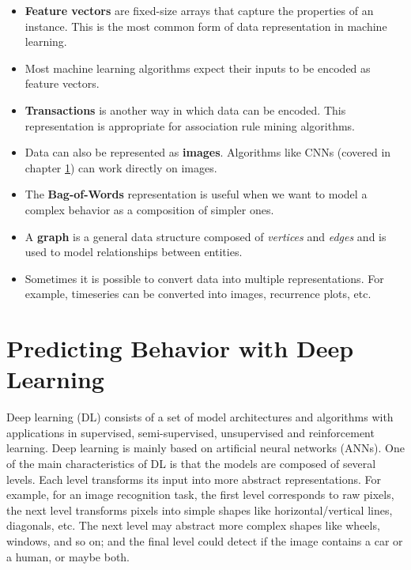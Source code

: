 \documentclass[
  11pt,
]{krantz}
\providecommand{\tightlist}{%
  \setlength{\itemsep}{0pt}\setlength{\parskip}{0pt}}
\begin{document}
\begin{itemize}
\tightlist
\item
  \textbf{Feature vectors} are fixed-size arrays that capture the properties of an instance. This is the most common form of data representation in machine learning.
\item
  Most machine learning algorithms expect their inputs to be encoded as feature vectors.
\item
  \textbf{Transactions} is another way in which data can be encoded. This representation is appropriate for association rule mining algorithms.
\item
  Data can also be represented as \textbf{images}. Algorithms like CNNs (covered in chapter \ref{deeplearning}) can work directly on images.
\item
  The \textbf{Bag-of-Words} representation is useful when we want to model a complex behavior as a composition of simpler ones.
\item
  A \textbf{graph} is a general data structure composed of \emph{vertices} and \emph{edges} and is used to model relationships between entities.
\item
  Sometimes it is possible to convert data into multiple representations. For example, timeseries can be converted into images, recurrence plots, etc.
\end{itemize}

\hypertarget{deeplearning}{%
\chapter{Predicting Behavior with Deep Learning}\label{deeplearning}}

Deep learning (DL) consists of a set of model architectures and algorithms with applications in supervised, semi-supervised, unsupervised and reinforcement learning. Deep learning is mainly based on artificial neural networks (ANNs). One of the main characteristics of DL is that the models are composed of several levels. Each level transforms its input into more abstract representations. For example, for an image recognition task, the first level corresponds to raw pixels, the next level transforms pixels into simple shapes like horizontal/vertical lines, diagonals, etc. The next level may abstract more complex shapes like wheels, windows, and so on; and the final level could detect if the image contains a car or a human, or maybe both.
\end{document}
